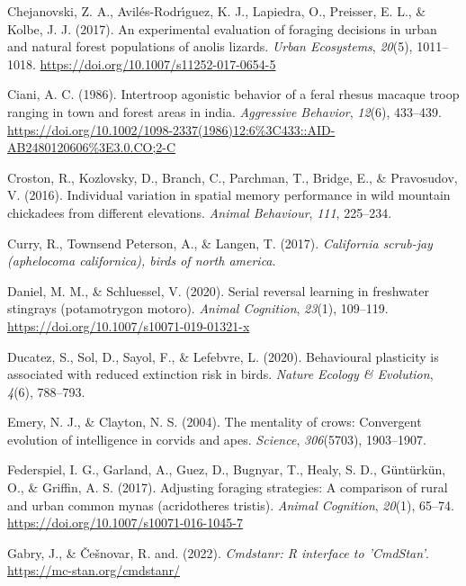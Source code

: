 \documentclass[
]{article}
\newlength{\cslhangindent}
\newenvironment{CSLReferences}[2] %
 {\begin{list}{}{%
  \setlength{\itemindent}{0pt}
  \setlength{\leftmargin}{0pt}
  \setlength{\parsep}{0pt}
  \ifodd #1
   \setlength{\leftmargin}{\cslhangindent}
   \setlength{\itemindent}{-1\cslhangindent}
  \fi
  \setlength{\itemsep}{#2\baselineskip}}}
 {\end{list}}
\begin{document}
\begin{CSLReferences}{1}{0}
Chejanovski, Z. A., Avilés-Rodrı́guez, K. J., Lapiedra, O., Preisser, E.
L., \& Kolbe, J. J. (2017). An experimental evaluation of foraging
decisions in urban and natural forest populations of anolis lizards.
\emph{Urban Ecosystems}, \emph{20}(5), 1011--1018.
\url{https://doi.org/10.1007/s11252-017-0654-5}

Ciani, A. C. (1986). Intertroop agonistic behavior of a feral rhesus
macaque troop ranging in town and forest areas in india.
\emph{Aggressive Behavior}, \emph{12}(6), 433--439.
\url{https://doi.org/10.1002/1098-2337(1986)12:6\%3C433::AID-AB2480120606\%3E3.0.CO;2-C}

Croston, R., Kozlovsky, D., Branch, C., Parchman, T., Bridge, E., \&
Pravosudov, V. (2016). Individual variation in spatial memory
performance in wild mountain chickadees from different elevations.
\emph{Animal Behaviour}, \emph{111}, 225--234.

Curry, R., Townsend Peterson, A., \& Langen, T. (2017). \emph{California
scrub-jay (aphelocoma californica), birds of north america}.

Daniel, M. M., \& Schluessel, V. (2020). Serial reversal learning in
freshwater stingrays (potamotrygon motoro). \emph{Animal Cognition},
\emph{23}(1), 109--119. \url{https://doi.org/10.1007/s10071-019-01321-x}

Ducatez, S., Sol, D., Sayol, F., \& Lefebvre, L. (2020). Behavioural
plasticity is associated with reduced extinction risk in birds.
\emph{Nature Ecology \& Evolution}, \emph{4}(6), 788--793.

Emery, N. J., \& Clayton, N. S. (2004). The mentality of crows:
Convergent evolution of intelligence in corvids and apes.
\emph{Science}, \emph{306}(5703), 1903--1907.

Federspiel, I. G., Garland, A., Guez, D., Bugnyar, T., Healy, S. D.,
Güntürkün, O., \& Griffin, A. S. (2017). Adjusting foraging strategies:
A comparison of rural and urban common mynas (acridotheres tristis).
\emph{Animal Cognition}, \emph{20}(1), 65--74.
\url{https://doi.org/10.1007/s10071-016-1045-7}

Gabry, J., \& Češnovar, R. and. (2022). \emph{Cmdstanr: R interface to
'CmdStan'}. \url{https://mc-stan.org/cmdstanr/}


\end{CSLReferences}
\end{document}
